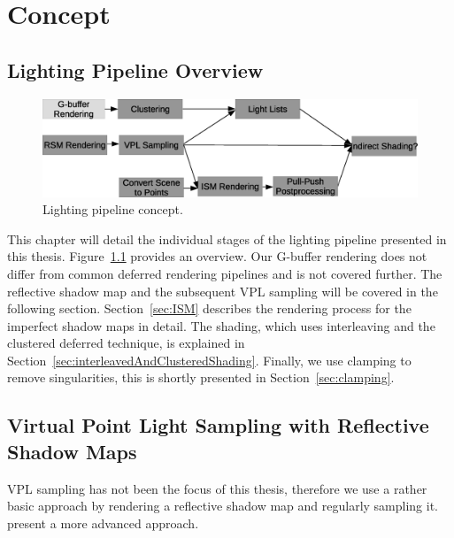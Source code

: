 
\chapter{Concept}

\section{Lighting Pipeline Overview}

\begin{figure}[h]
    \includegraphics[width=\textwidth]{graphics/Lighting_pipeline_concept_rough}
    \caption{Lighting pipeline concept.}
    \label{fig:LightingPipelineConcept}
\end{figure}




This chapter will detail the individual stages of the lighting pipeline presented in this thesis. Figure~\ref{fig:LightingPipelineConcept} provides an overview.
Our G-buffer rendering does not differ from common deferred rendering pipelines and is not covered further.
The reflective shadow map and the subsequent VPL sampling will be covered in the following section.
Section~\ref{sec:ISM} describes the rendering process for the imperfect shadow maps in detail.
The shading, which uses interleaving and the clustered deferred technique, is explained in Section~\ref{sec:interleavedAndClusteredShading}.
Finally, we use clamping to remove singularities, this is shortly presented in Section~\ref{sec:clamping}.


\section{Virtual Point Light Sampling with Reflective Shadow Maps}
\label{sec:RsmVplSampling}

VPL sampling has not been the focus of this thesis, therefore we use a rather basic approach by rendering a  reflective shadow map \parencite{Dachsbacher:2005:RSM} and regularly sampling it. \citet{hedman2016sequential} present a more advanced approach.

